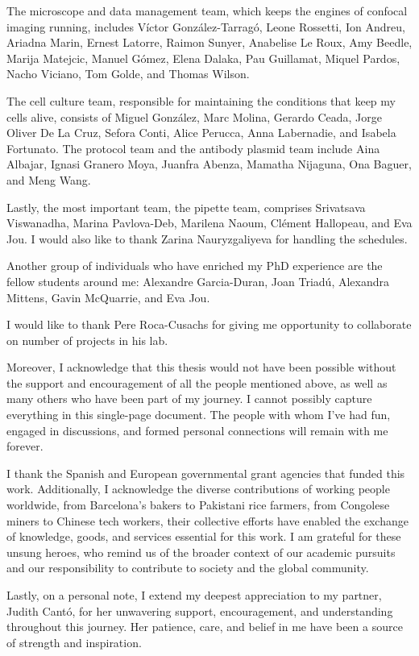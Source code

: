 \begin{Acknowledgements}
The microscope and data management team, which keeps the engines of confocal imaging running, includes Víctor González-Tarragó, Leone Rossetti, Ion Andreu, Ariadna Marin, Ernest Latorre, Raimon Sunyer, Anabelise Le Roux, Amy Beedle, Marija Matejcic, Manuel Gómez, Elena Dalaka, Pau Guillamat, Miquel Pardos, Nacho Viciano, Tom Golde, and Thomas Wilson.

The cell culture team, responsible for maintaining the conditions that keep my cells alive, consists of Miguel González, Marc Molina, Gerardo Ceada, Jorge Oliver De La Cruz, Sefora Conti, Alice Perucca, Anna Labernadie, and Isabela Fortunato. The protocol team and the antibody plasmid team include Aina Albajar, Ignasi Granero Moya, Juanfra Abenza, Mamatha Nijaguna, Ona Baguer, and Meng Wang.

Lastly, the most important team, the pipette team, comprises Srivatsava Viswanadha, Marina Pavlova-Deb, Marilena Naoum, Clément Hallopeau, and Eva Jou. I would also like to thank Zarina Nauryzgaliyeva for handling the schedules.
	
Another group of individuals who have enriched my PhD experience are the fellow students around me: Alexandre Garcia-Duran, Joan Triadú, Alexandra Mittens, Gavin McQuarrie, and Eva Jou.

I would like to thank Pere Roca-Cusachs for giving me opportunity to collaborate on number of projects in his lab.

Moreover, I acknowledge that this thesis would not have been possible without the support and encouragement of all the people mentioned above, as well as many others who have been part of my journey. I cannot possibly capture everything in this single-page document. The people with whom I've had fun, engaged in discussions, and formed personal connections will remain with me forever.

I thank the Spanish and European governmental grant agencies that funded this work. Additionally, I acknowledge the diverse contributions of working people worldwide, from Barcelona's bakers to Pakistani rice farmers, from  Congolese miners to Chinese tech workers, their collective efforts have enabled the exchange of knowledge, goods, and services essential for this work. I am grateful for these unsung heroes, who remind us of the broader context of our academic pursuits and our responsibility to contribute to society and the global community.
	
Lastly, on a personal note, I extend my deepest appreciation to my partner, Judith Cantó, for her unwavering support, encouragement, and understanding throughout this journey. Her patience, care, and belief in me have been a source of strength and inspiration.


\end{Acknowledgements}
